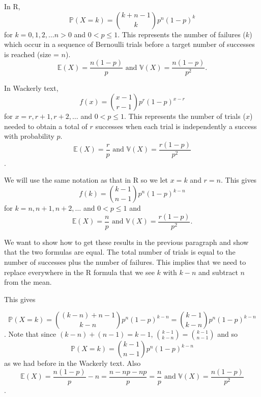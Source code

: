\documentclass[]{article}
\begin{document}
In R, $$\mathbb{P}(X = k) = \binom{k + n - 1}{k} p^n (1-p)^k$$ for $k = 0, 1, 2, \ldots n >0$ and $0 < p \le 1$.  This represents the number of failures ($k$) which occur in a sequence of Bernoulli trials before a target number of successes is reached (size = $n$).  $$\mathbb{E} (X) = \dfrac{n(1-p)}{p} \text{ and } \mathbb{V} (X) = \dfrac{n(1-p)}{p^2}.$$

In Wackerly text, $$f(x) = \binom{x -1}{r-1} p^r (1-p)^{x-r}$$ for $x = r, r+1, r+2, \ldots$ and $0 < p \le 1$.  This represents the number of trials ($x$) needed to obtain a total of $r$ successes when each trial is independently a success with probability $p$.  $$\mathbb{E} (X) = \dfrac{r}{p} \text{ and } \mathbb{V} (X) = \dfrac{r(1-p)}{p^2}$$.  

We will use the same notation as that in R so we let $x = k$ and $r = n$.  This gives $$f(k) = \binom{k -1}{n-1} p^n (1-p)^{k-n}$$ for $k = n, n+1, n+2, \ldots$ and $0 < p \le 1$ and $$\mathbb{E} (X) = \dfrac{n}{p} \text{ and } \mathbb{V} (X) = \dfrac{r(1-p)}{p^2}.$$ 

We want to show how to get these results in the previous paragraph and show that the two formulas are equal.  The total number of trials is equal to the number of successes plus the number of failures.  This implies that we need to replace everywhere in the R formula that we see $k$ with $k-n$ and subtract $n$ from the mean.  

This gives

$$\mathbb{P}(X = k) = \binom{(k-n) + n - 1}{k-n} p^n (1-p)^{k-n} = \binom{k - 1}{k-n} p^n (1-p)^{k-n}$$.  Note that since $(k - n) + (n - 1) = k-1$, $\binom{k-1}{k-n} = \binom{k-1}{n-1}$ and so $$\mathbb{P}(X = k) = \binom{k - 1}{n - 1} p^n (1-p)^{k-n}$$ as we had before in the Wackerly text. Also $$\mathbb{E} (X) = \dfrac{n(1-p)}{p} - n = \dfrac{n - np - np}{p} = \dfrac{n}{p} \text{ and } \mathbb{V} (X) = \dfrac{n(1-p)}{p^2}$$.
\end{document}
